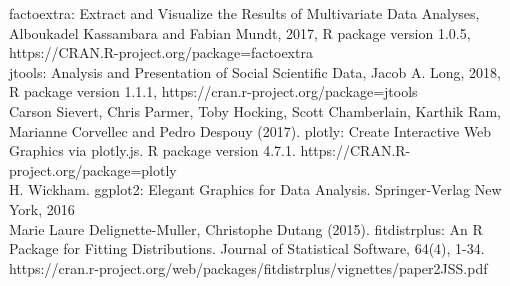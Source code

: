 
\noindent
[8] factoextra: Extract and Visualize the Results of Multivariate Data Analyses, Alboukadel Kassambara and
Fabian Mundt, 2017, R package version 1.0.5, \\https://CRAN.R-project.org/package=factoextra \\

\noindent
[9] jtools: Analysis and Presentation of Social Scientific Data, Jacob A. Long, 2018, R package version 1.1.1,
https://cran.r-project.org/package=jtools \\

\noindent
[10] Carson Sievert, Chris Parmer, Toby Hocking, Scott Chamberlain, Karthik Ram, Marianne Corvellec and
Pedro Despouy (2017). plotly: Create Interactive Web Graphics via plotly.js. R package version 4.7.1.
https://CRAN.R-project.org/package=plotly \\

\noindent
[11] H. Wickham. ggplot2: Elegant Graphics for Data Analysis. Springer-Verlag New York, 2016 \\

\noindent
[16] Marie Laure Delignette-Muller, Christophe Dutang (2015). fitdistrplus: An R Package for Fitting Distributions. Journal of Statistical Software, 64(4), 1-34.\\
 https://cran.r-project.org/web/packages/fitdistrplus/vignettes/paper2JSS.pdf\\


